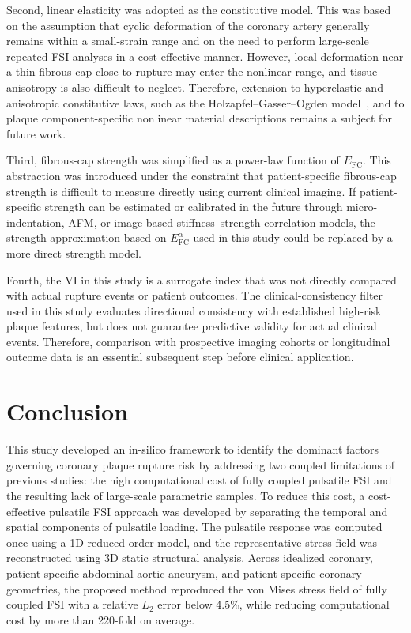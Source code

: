 \documentclass[master,english,final]{kaist-ucs}
\begin{document}
Second, linear elasticity was adopted as the constitutive model. This was based on the assumption that cyclic deformation of the coronary artery generally remains within a small-strain range and on the need to perform large-scale repeated FSI analyses in a cost-effective manner. However, local deformation near a thin fibrous cap close to rupture may enter the nonlinear range, and tissue anisotropy is also difficult to neglect. Therefore, extension to hyperelastic and anisotropic constitutive laws, such as the Holzapfel--Gasser--Ogden model~\cite{hgo}, and to plaque component-specific nonlinear material descriptions remains a subject for future work.

Third, fibrous-cap strength was simplified as a power-law function of $E_\mathrm{FC}$. This abstraction was introduced under the constraint that patient-specific fibrous-cap strength is difficult to measure directly using current clinical imaging. If patient-specific strength can be estimated or calibrated in the future through micro-indentation, AFM, or image-based stiffness--strength correlation models, the strength approximation based on $E_\mathrm{FC}^{\alpha}$ used in this study could be replaced by a more direct strength model.

Fourth, the VI in this study is a surrogate index that was not directly compared with actual rupture events or patient outcomes. The clinical-consistency filter used in this study evaluates directional consistency with established high-risk plaque features, but does not guarantee predictive validity for actual clinical events. Therefore, comparison with prospective imaging cohorts or longitudinal outcome data is an essential subsequent step before clinical application.


\chapter{Conclusion}

This study developed an in-silico framework to identify the dominant factors governing coronary plaque rupture risk by addressing two coupled limitations of previous studies: the high computational cost of fully coupled pulsatile FSI and the resulting lack of large-scale parametric samples. To reduce this cost, a cost-effective pulsatile FSI approach was developed by separating the temporal and spatial components of pulsatile loading. The pulsatile response was computed once using a 1D reduced-order model, and the representative stress field was reconstructed using 3D static structural analysis. Across idealized coronary, patient-specific abdominal aortic aneurysm, and patient-specific coronary geometries, the proposed method reproduced the von Mises stress field of fully coupled FSI with a relative $L_2$ error below 4.5\%, while reducing computational cost by more than 220-fold on average.
\end{document}
